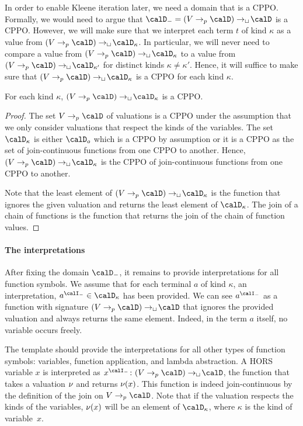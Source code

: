 \documentclass[../../diss.tex]{subfiles}
\begin{document}
In order to enable Kleene iteration later, we need a domain that is a CPPO.\@
Formally, we would need to argue that $\domaint = (V \pto \domain) \cto \domain$ is a CPPO.\@
However, we will make sure that we interpret each term $t$ of kind $\kappa$ as a value from $(V \pto \domain) \cto \domain{\kappa}$.
In particular, we will never need to compare a value from $(V \pto \domain) \cto \domain{\kappa}$ to a value from $(V \pto \domain) \cto \domain{\kappa'}$ for distinct kinds $\kappa \neq \kappa'$.
Hence, it will suffice to make sure that $(V \pto \domain) \cto \domain{\kappa}$ is a CPPO for each kind $\kappa$.

\begin{lemma}
    For each kind $\kappa$, $(V \pto \domain) \cto \domain{\kappa}$ is a CPPO.\@
\end{lemma}

\begin{proof}
    The set $V \pto \domain$ of valuations is a CPPO under the assumption that we only consider valuations that respect the kinds of the variables.
    The set $\domain{\kappa}$ is either $\domain{\ground}$ which is a CPPO by assumption or it is a CPPO as the set of join-continuous functions from one CPPO to another.
    Hence, $(V \pto \domain) \cto \domain{\kappa}$ is the CPPO of join-continuous functions from one CPPO to another.

    Note that the least element of $(V \pto \domain) \cto \domain{\kappa}$ is the function that ignores the given valuation and returns the least element of $\domain{\kappa}$.
    The join of a chain of functions is the function that returns the join of the chain of function values.
\end{proof}

\paragraph{The interpretations}

After fixing the domain $\domaint$, it remains to provide interpretations for all function symbols.
We assume that for each terminal $a$ of kind $\kappa$, an interpretation, $a^\interpretationt \in \domain{\kappa}$ has been provided.
We can see $a^\interpretationt$ as a function with signature $(V \pto \domain) \cto \domain$ that ignores the provided valuation and always returns the same element.
Indeed, in the term $a$ itself, no variable occurs freely.

The template should provide the interpretations for all other types of function symbols: variables, function application, and lambda abstraction.
A HORS variable $x$ is interpreted as $x^\interpretationt \colon (V \pto \domain) \cto \domain$, the function that takes a valuation $\nu$ and returns $\nu(x)$.
This function is indeed join-continuous by the definition of the join on $V \pto \domain$.
Note that if the valuation respects the kinds of the variables, $\nu(x)$ will be an element of $\domain{\kappa}$, where $\kappa$ is the kind of variable~$x$.
\end{document}
